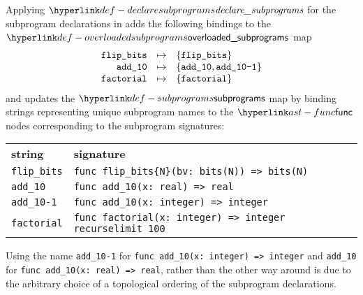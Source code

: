 Applying $\declaresubprograms$ for the subprogram declarations in 
adds the following bindings to the $\overloadedsubprograms$ map
\[
\begin{array}{rcl}
  \texttt{flip\_bits} &\mapsto& \{\texttt{flip\_bits}\} \\
  \texttt{add\_10}    &\mapsto& \{\texttt{add\_10}, \texttt{add\_10-1}\} \\
  \texttt{factorial}  &\mapsto& \{\texttt{factorial}\} \\
\end{array}
\]
and updates the $\subprograms$ map by binding
strings representing unique subprogram names to the $\func$ nodes corresponding to
the subprogram signatures:
\begin{center}
\begin{tabular}{ll}
\textbf{string}     & \textbf{signature}\\
\texttt{flip\_bits} & \verb|func flip_bits{N}(bv: bits(N)) => bits(N)|\\
\texttt{add\_10}    & \verb|func add_10(x: real) => real|\\
\texttt{add\_10-1}  & \verb|func add_10(x: integer) => integer|\\
\texttt{factorial}  & \verb|func factorial(x: integer) => integer recurselimit 100|
\end{tabular}
\end{center}

Using the name \texttt{add\_10-1} for \verb|func add_10(x: integer) => integer|
and \texttt{add\_10} for \verb|func add_10(x: real) => real|, rather than
the other way around is due to the arbitrary choice of a topological ordering
of the subprogram declarations.


